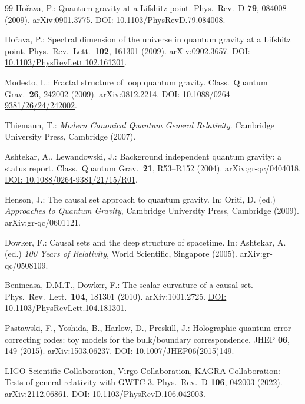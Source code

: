 ﻿\documentclass[12pt,a4paper]{article}
\theoremstyle{definition}
\begin{document}
\begin{thebibliography}{99}
Ho\v{r}ava, P.: Quantum gravity at a Lifshitz point. Phys.\ Rev.\ D \textbf{79}, 084008 (2009). arXiv:0901.3775. \href{https://doi.org/10.1103/PhysRevD.79.084008}{DOI: 10.1103/PhysRevD.79.084008}.

Ho\v{r}ava, P.: Spectral dimension of the universe in quantum gravity at a Lifshitz point. Phys.\ Rev.\ Lett.\ \textbf{102}, 161301 (2009). arXiv:0902.3657. \href{https://doi.org/10.1103/PhysRevLett.102.161301}{DOI: 10.1103/PhysRevLett.102.161301}.

Modesto, L.: Fractal structure of loop quantum gravity. Class.\ Quantum Grav.\ \textbf{26}, 242002 (2009). arXiv:0812.2214. \href{https://doi.org/10.1088/0264-9381/26/24/242002}{DOI: 10.1088/0264-9381/26/24/242002}.

Thiemann, T.: \textit{Modern Canonical Quantum General Relativity}. Cambridge University Press, Cambridge (2007).

Ashtekar, A., Lewandowski, J.: Background independent quantum gravity: a status report. Class.\ Quantum Grav.\ \textbf{21}, R53--R152 (2004). arXiv:gr-qc/0404018. \href{https://doi.org/10.1088/0264-9381/21/15/R01}{DOI: 10.1088/0264-9381/21/15/R01}.

Henson, J.: The causal set approach to quantum gravity. In: Oriti, D. (ed.) \textit{Approaches to Quantum Gravity}, Cambridge University Press, Cambridge (2009). arXiv:gr-qc/0601121.

Dowker, F.: Causal sets and the deep structure of spacetime. In: Ashtekar, A. (ed.) \textit{100 Years of Relativity}, World Scientific, Singapore (2005). arXiv:gr-qc/0508109.

Benincasa, D.M.T., Dowker, F.: The scalar curvature of a causal set. Phys.\ Rev.\ Lett.\ \textbf{104}, 181301 (2010). arXiv:1001.2725. \href{https://doi.org/10.1103/PhysRevLett.104.181301}{DOI: 10.1103/PhysRevLett.104.181301}.

Pastawski, F., Yoshida, B., Harlow, D., Preskill, J.: Holographic quantum error-correcting codes: toy models for the bulk/boundary correspondence. JHEP \textbf{06}, 149 (2015). arXiv:1503.06237. \href{https://doi.org/10.1007/JHEP06(2015)149}{DOI: 10.1007/JHEP06(2015)149}.

LIGO Scientific Collaboration, Virgo Collaboration, KAGRA Collaboration: Tests of general relativity with GWTC-3. Phys.\ Rev.\ D \textbf{106}, 042003 (2022). arXiv:2112.06861. \href{https://doi.org/10.1103/PhysRevD.106.042003}{DOI: 10.1103/PhysRevD.106.042003}.


\end{thebibliography}
\end{document}
